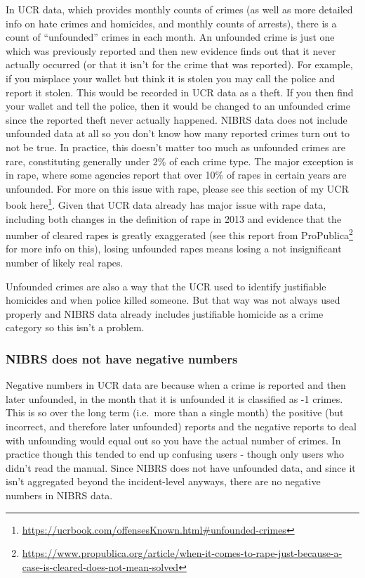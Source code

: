 \documentclass[
]{krantz}
\renewcommand{\href}[2]{#2\footnote{\url{#1}}}
\begin{document}
In UCR data, which provides monthly counts of crimes (as
well as more detailed info on hate crimes and homicides, and
monthly counts of arrests), there is a count of
``unfounded'' crimes in each month. An unfounded crime is
just one which was previously reported and then new evidence
finds out that it never actually occurred (or that it isn't
for the crime that was reported). For example, if you
misplace your wallet but think it is stolen you may call the
police and report it stolen. This would be recorded in UCR
data as a theft. If you then find your wallet and tell the
police, then it would be changed to an unfounded crime since
the reported theft never actually happened. NIBRS data does
not include unfounded data at all so you don't know how many
reported crimes turn out to not be true. In practice, this
doesn't matter too much as unfounded crimes are rare,
constituting generally under 2\% of each crime type. The
major exception is in rape, where some agencies report that
over 10\% of rapes in certain years are unfounded. For more
on this issue with rape, please see this section of my UCR
book
\href{https://ucrbook.com/offensesKnown.html\#unfounded-crimes}{here}.
Given that UCR data already has major issue with rape data,
including both changes in the definition of rape in 2013 and
evidence that the number of cleared rapes is greatly
exaggerated (see
\href{https://www.propublica.org/article/when-it-comes-to-rape-just-because-a-case-is-cleared-does-not-mean-solved}{this
report from ProPublica} for more info on this), losing
unfounded rapes means losing a not insignificant number of
likely real rapes.

Unfounded crimes are also a way that the UCR used to
identify justifiable homicides and when police killed
someone. But that way was not always used properly and NIBRS
data already includes justifiable homicide as a crime
category so this isn't a problem.

\subsubsection{NIBRS does not have negative
numbers}\label{nibrs-does-not-have-negative-numbers}

Negative numbers in UCR data are because when a crime is
reported and then later unfounded, in the month that it is
unfounded it is classified as -1 crimes. This is so over the
long term (i.e.~more than a single month) the positive (but
incorrect, and therefore later unfounded) reports and the
negative reports to deal with unfounding would equal out so
you have the actual number of crimes. In practice though
this tended to end up confusing users - though only users
who didn't read the manual. Since NIBRS does not have
unfounded data, and since it isn't aggregated beyond the
incident-level anyways, there are no negative numbers in
NIBRS data.
\end{document}
